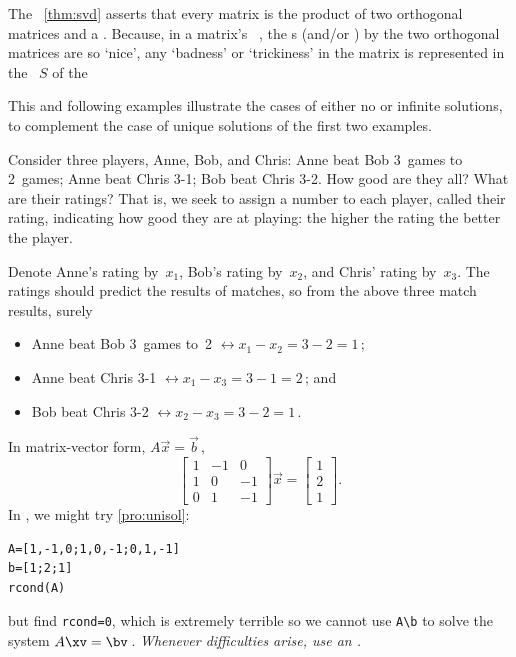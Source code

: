 The \svd\ \cref{thm:svd} asserts that every matrix is the product of two orthogonal matrices and a .  
Because, in a matrix's \svd\ , the s (and/or ) by the two orthogonal matrices are so `nice', any `badness' or `trickiness' in the matrix is represented in the ~\(S\) of the 

This and following examples illustrate the cases of either no or infinite solutions, to complement the case of unique solutions of the first two examples.

\begin{example} \label{eg:rstp}
    Consider three  players, Anne, Bob, and Chris:
        Anne beat Bob 3~games to 2~games;
        Anne beat Chris 3-1;
        Bob beat Chris 3-2.
How good are they all?  What are their ratings?  
That is, we seek to assign a number to each player, called their rating, indicating how good they are at playing: the higher the rating the better the player. 
    
\begin{solution} 
    Denote Anne's rating by~$x_1$, Bob's rating by~$x_2$, and Chris' 
    rating by~$x_3$.    
	The ratings should predict the results of matches, so from the
	above three match results, surely
	\begin{itemize}
\item Anne beat Bob 3~games to~2 \(\leftrightarrow x_1-x_2=3-2=1\)\,;
\item Anne beat Chris 3-1 \(\leftrightarrow x_1-x_3=3-1=2\)\,; and
\item Bob beat Chris 3-2 \(\leftrightarrow x_2-x_3=3-2=1\)\,.
\end{itemize}
    In matrix-vector form, $A\vec x=\vec b$\,,
    \begin{displaymath}
        \begin{bmatrix}
            1&-1&0\\ 1&0&-1\\ 0&1&-1
        \end{bmatrix}\vec x=
        \begin{bmatrix}
            1\\ 2\\ 1
        \end{bmatrix}.
    \end{displaymath}
\setbox\ajrqrbox\hbox{}%
\marginajrbox%
In \script,  we might try \cref{pro:unisol}:
\begin{verbatim}
A=[1,-1,0;1,0,-1;0,1,-1]
b=[1;2;1]
rcond(A)
\end{verbatim}
but find \verb|rcond=0|, which is extremely terrible so we cannot use \verb|A\b| to solve the system \(A\xv=\bv\)\,.
\emph{Whenever difficulties arise, use an \svd.}


\end{solution}
\end{example}
